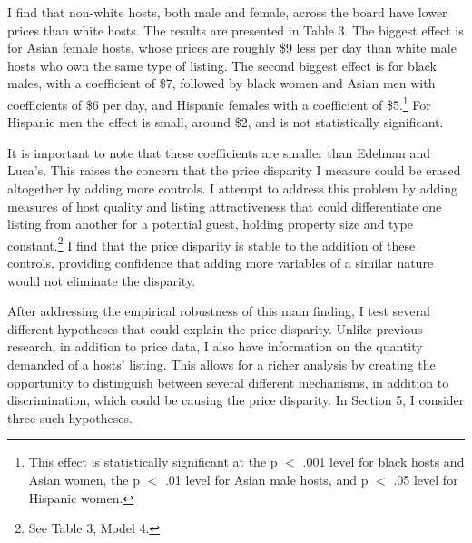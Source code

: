 \documentclass[11pt, oneside]{article}
\begin{document}
I find that non-white hosts, both male and female, across the board have lower prices than white hosts. The results are presented in Table 3. The biggest effect is for Asian female hosts, whose prices are roughly \$9 less per day than white male hosts who own the same type of listing. The second biggest effect is for black males, with a coefficient of \$7, followed by black women and Asian men with coefficients of \$6 per day, and Hispanic females with a coefficient of \$5.\footnote{This effect is statistically significant at the p $<$ .001 level for black hosts and Asian women, the p $<$ .01 level for Asian male hosts, and p $<$ .05 level for Hispanic women.} For Hispanic men the effect is small, around \$2, and is not statistically significant.

It is important to note that these coefficients are smaller than Edelman and Luca's. This raises the concern that the price disparity I measure could be erased altogether by adding more controls. I attempt to address this problem by adding measures of host quality and listing attractiveness that could differentiate one listing from another for a potential guest, holding property size and type constant.\footnote{See Table 3, Model 4.} I find that the price disparity is stable to the addition of these controls, providing confidence that adding more variables of a similar nature would not eliminate the disparity. 

After addressing the empirical robustness of this main finding, I test several different hypotheses that could explain the price disparity. Unlike previous research, in addition to price data, I also have information on the quantity demanded of a hosts' listing. This allows for a richer analysis by creating the opportunity to distinguish between several different mechanisms, in addition to discrimination, which could be causing the price disparity. In Section 5, I consider three such hypotheses. 

\end{document}
